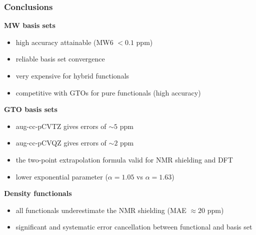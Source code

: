 \begin{frame}
\frametitle{Conclusions}
\textbf{MW basis sets}
\begin{itemize}
    \item   high accuracy attainable (MW6 $< 0.1$ ppm)
    \item   reliable basis set convergence
    \item   very expensive for hybrid functionals
    \item   competitive with GTOs for pure functionals (high accuracy)
\end{itemize}

\vspace{5mm}

\textbf{GTO basis sets}
\begin{itemize}
    \item   aug-cc-pCVTZ gives errors of $\sim 5$ ppm
    \item   aug-cc-pCVQZ gives errors of $\sim 2$ ppm
    \item   the two-point extrapolation formula valid for NMR shielding and DFT
    \item   lower exponential parameter ($\alpha = 1.05$ vs $\alpha = 1.63$) 
\end{itemize}

\vspace{5mm}

\textbf{Density functionals}
\begin{itemize}
    \item   all functionals underestimate the NMR shielding (MAE $\approx 20$ ppm) 
    \item   significant and systematic error cancellation between functional and basis set
\end{itemize}
\end{frame}

